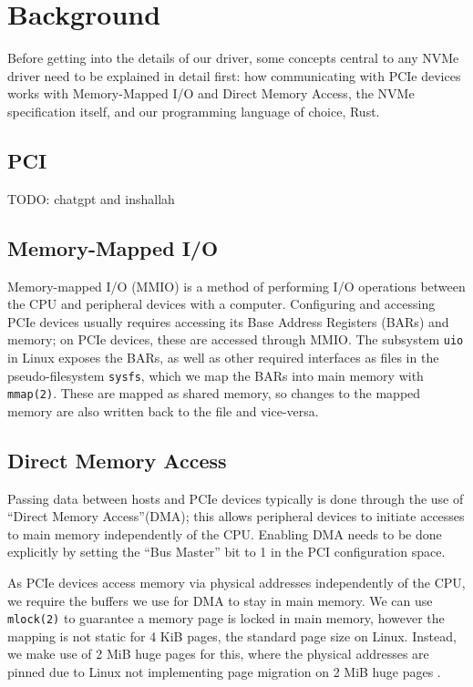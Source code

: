 \chapter{Background}\label{chapter:basics}

Before getting into the details of our driver, some concepts central to any NVMe driver need to be explained in detail first: how communicating with PCIe devices works with Memory-Mapped I/O and Direct Memory Access, the NVMe specification itself, and our programming language of choice, Rust.

\section{PCI}
TODO: chatgpt and inshallah

\section{Memory-Mapped I/O}
Memory-mapped I/O (MMIO) is a method of performing I/O operations between the CPU and peripheral devices with a computer. Configuring and accessing PCIe devices usually requires accessing its Base Address Registers (BARs) and memory; on PCIe devices, these are accessed through MMIO. The subsystem \texttt{uio} in Linux exposes the BARs, as well as other required interfaces as files in the pseudo-filesystem \texttt{sysfs}, which we map the BARs into main memory with \texttt{mmap(2)}. These are mapped as shared memory, so changes to the mapped memory are also written back to the file and vice-versa.

\section{Direct Memory Access}
Passing data between hosts and PCIe devices typically is done through the use of ``Direct Memory Access''(DMA); this allows peripheral devices to initiate accesses to main memory independently of the CPU. Enabling DMA needs to be done explicitly by setting the ``Bus Master'' bit to 1 in the PCI configuration space.

As PCIe devices access memory via physical addresses independently of the CPU, we require the buffers we use for DMA to stay in main memory. We can use \texttt{mlock(2)} to guarantee a memory page is locked in main memory, however the mapping is not static for 4 KiB pages, the standard page size on Linux. Instead, we make use of 2 MiB huge pages for this, where the physical addresses are pinned due to Linux not implementing page migration on 2 MiB huge pages \cite{user_space_net}.

